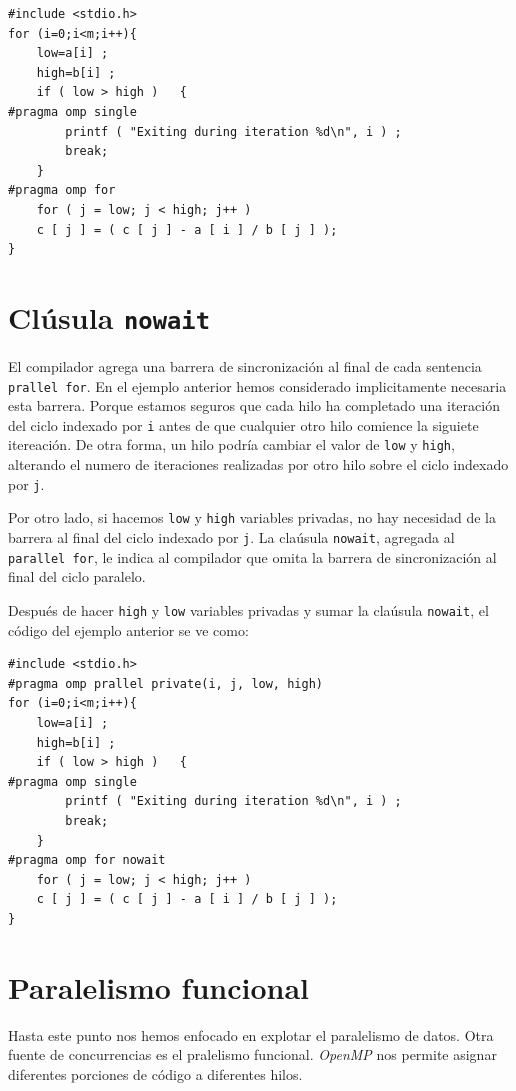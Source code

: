 \documentclass[12pt,letterpaper]{book}
\begin{document}
\begin{lstlisting}[style=C]
#include <stdio.h>
for (i=0;i<m;i++){
	low=a[i] ;
	high=b[i] ;
	if ( low > high )	{
#pragma omp single
		printf ( "Exiting during iteration %d\n", i ) ;
		break;
	}
#pragma omp for
	for ( j = low; j < high; j++ )
	c [ j ] = ( c [ j ] - a [ i ] / b [ j ] );
}
\end{lstlisting}


\section{Clúsula \texttt{nowait}}
El compilador agrega una barrera de sincronización al final de cada sentencia \texttt{prallel for}. En el ejemplo anterior hemos considerado implicitamente necesaria esta barrera. Porque estamos seguros que cada hilo ha completado una iteración del ciclo indexado por \texttt{i} antes de que cualquier otro hilo comience la siguiete itereación. De otra forma, un hilo podría cambiar el valor de \texttt{low} y \texttt{high}, alterando el numero de iteraciones realizadas por otro hilo sobre el ciclo indexado por \texttt{j}.

Por otro lado, si hacemos \texttt{low} y \texttt{high} variables privadas, no hay necesidad de la barrera al final del ciclo indexado por \texttt{j}. La claúsula \texttt{nowait}, agregada al \texttt{parallel for}, le indica al compilador que omita la barrera de sincronización al final del ciclo paralelo.

Después de hacer \texttt{high} y \texttt{low} variables privadas y sumar la claúsula \texttt{nowait}, el código del ejemplo anterior se ve como:

\begin{lstlisting}[style=C]
#include <stdio.h>
#pragma omp prallel private(i, j, low, high)
for (i=0;i<m;i++){
	low=a[i] ;
	high=b[i] ;
	if ( low > high )	{
#pragma omp single
		printf ( "Exiting during iteration %d\n", i ) ;
		break;
	}
#pragma omp for nowait
	for ( j = low; j < high; j++ )
	c [ j ] = ( c [ j ] - a [ i ] / b [ j ] );
}
\end{lstlisting}


\section{Paralelismo funcional}
Hasta este punto nos hemos enfocado en explotar el paralelismo de datos. Otra fuente de concurrencias es el pralelismo funcional. \textit{OpenMP} nos permite asignar diferentes porciones de código a diferentes hilos.
\end{document}
